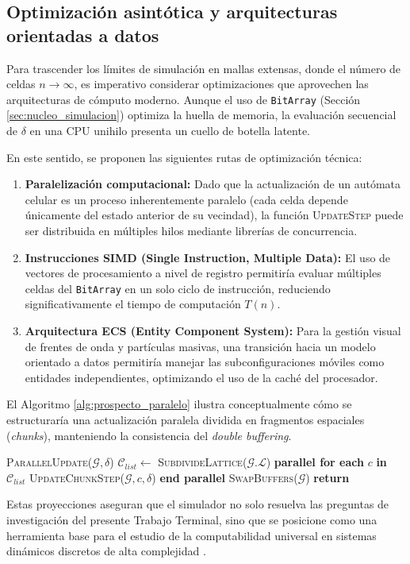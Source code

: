 \subsection{Optimización asintótica y arquitecturas orientadas a datos}

Para trascender los límites de simulación en mallas extensas, donde el número de celdas $n \to \infty$, es imperativo considerar optimizaciones que aprovechen las arquitecturas de cómputo moderno. Aunque el uso de \texttt{BitArray} (Sección \ref{sec:nucleo_simulacion}) optimiza la huella de memoria, la evaluación secuencial de $\delta$ en una CPU unihilo presenta un cuello de botella latente.

En este sentido, se proponen las siguientes rutas de optimización técnica:
\begin{enumerate}
    \item \textbf{Paralelización computacional:} Dado que la actualización de un autómata celular es un proceso inherentemente paralelo (cada celda depende únicamente del estado anterior de su vecindad), la función \textsc{UpdateStep} puede ser distribuida en múltiples hilos mediante librerías de concurrencia.
    \item \textbf{Instrucciones SIMD (Single Instruction, Multiple Data):} El uso de vectores de procesamiento a nivel de registro permitiría evaluar múltiples celdas del \texttt{BitArray} en un solo ciclo de instrucción, reduciendo significativamente el tiempo de computación $T(n)$.
    \item \textbf{Arquitectura ECS (Entity Component System):} Para la gestión visual de frentes de onda y partículas masivas, una transición hacia un modelo orientado a datos permitiría manejar las subconfiguraciones móviles como entidades independientes, optimizando el uso de la caché del procesador.
\end{enumerate}

El Algoritmo \ref{alg:prospecto_paralelo} ilustra conceptualmente cómo se estructuraría una actualización paralela dividida en fragmentos espaciales (\textit{chunks}), manteniendo la consistencia del \textit{double buffering}.

\begin{algorithm}[H]
\caption{Estructura conceptual de evolución paralela por fragmentación.}\label{alg:prospecto_paralelo}
\begin{algorithmic}
\STATE 
\STATE \textsc{ParallelUpdate}($\mathcal{G}, \delta$)
\STATE \hspace{0.5cm}$ \mathcal{C}_{list} \gets $ \textsc{SubdivideLattice}($\mathcal{G}.\mathcal{L}$)
\STATE \hspace{0.5cm}\textbf{parallel for each} $c$ \textbf{ in } $\mathcal{C}_{list}$
\STATE \hspace{1.0cm}\textsc{UpdateChunkStep}($\mathcal{G}, c, \delta$)
\STATE \hspace{0.5cm}\textbf{end parallel}
\STATE \hspace{0.5cm}\textsc{SwapBuffers}($\mathcal{G}$)
\STATE \textbf{return}
\end{algorithmic}
\end{algorithm}

Estas proyecciones aseguran que el simulador no solo resuelva las preguntas de investigación del presente Trabajo Terminal, sino que se posicione como una herramienta base para el estudio de la computabilidad universal en sistemas dinámicos discretos de alta complejidad \cite{Kari2005}.